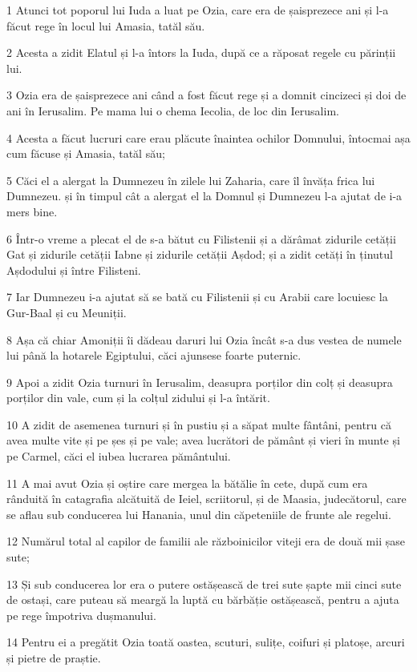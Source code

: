 \par 1 Atunci tot poporul lui Iuda a luat pe Ozia, care era de șaisprezece ani și l-a făcut rege în locul lui Amasia, tatăl său.
\par 2 Acesta a zidit Elatul și l-a întors la Iuda, după ce a răposat regele cu părinții lui.
\par 3 Ozia era de șaisprezece ani când a fost făcut rege și a domnit cincizeci și doi de ani în Ierusalim. Pe mama lui o chema Iecolia, de loc din Ierusalim.
\par 4 Acesta a făcut lucruri care erau plăcute înaintea ochilor Domnului, întocmai așa cum făcuse și Amasia, tatăl său;
\par 5 Căci el a alergat la Dumnezeu în zilele lui Zaharia, care îl învăța frica lui Dumnezeu. și în timpul cât a alergat el la Domnul și Dumnezeu l-a ajutat de i-a mers bine.
\par 6 Într-o vreme a plecat el de s-a bătut cu Filistenii și a dărâmat zidurile cetății Gat și zidurile cetății Iabne și zidurile cetății Așdod; și a zidit cetăți în ținutul Așdodului și între Filisteni.
\par 7 Iar Dumnezeu i-a ajutat să se bată cu Filistenii și cu Arabii care locuiesc la Gur-Baal și cu Meuniții.
\par 8 Așa că chiar Amoniții îi dădeau daruri lui Ozia încât s-a dus vestea de numele lui până la hotarele Egiptului, căci ajunsese foarte puternic.
\par 9 Apoi a zidit Ozia turnuri în Ierusalim, deasupra porților din colț și deasupra porților din vale, cum și la colțul zidului și l-a întărit.
\par 10 A zidit de asemenea turnuri și în pustiu și a săpat multe fântâni, pentru că avea multe vite și pe șes și pe vale; avea lucrători de pământ și vieri în munte și pe Carmel, căci el iubea lucrarea pământului.
\par 11 A mai avut Ozia și oștire care mergea la bătălie în cete, după cum era rânduită în catagrafia alcătuită de Ieiel, scriitorul, și de Maasia, judecătorul, care se aflau sub conducerea lui Hanania, unul din căpeteniile de frunte ale regelui.
\par 12 Numărul total al capilor de familii ale războinicilor viteji era de două mii șase sute;
\par 13 Și sub conducerea lor era o putere ostășească de trei sute șapte mii cinci sute de ostași, care puteau să meargă la luptă cu bărbăție ostășească, pentru a ajuta pe rege împotriva dușmanului.
\par 14 Pentru ei a pregătit Ozia toată oastea, scuturi, sulițe, coifuri și platoșe, arcuri și pietre de praștie.
